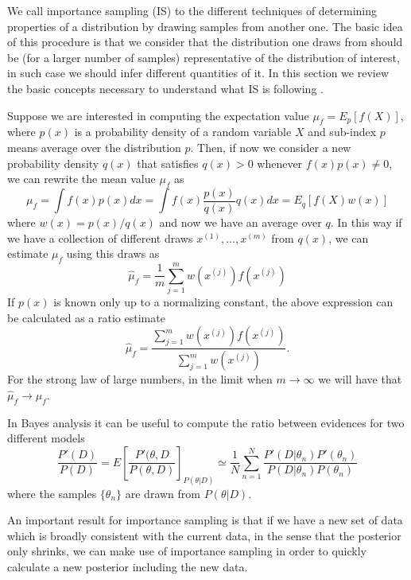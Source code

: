 \documentclass[onecolumn,           %
               showpacs,            %
               preprintnumbers,     %
               aps,                 %
               prl,          	    %
               letterpaper,             %
               superscriptaddress,      %
               nofootinbib,         %
               tightenlines,        %
               floats,floatfix      %
               ,usenatbib,
               ]{revtex4-1}
\begin{document}
We call importance sampling (IS) to the different techniques of determining properties of a distribution by drawing samples from another one. The basic idea of this procedure is that we consider that the distribution one draws from should be (for a larger number of samples) 
 representative of the distribution of interest, in such case we should infer different quantities of it. In this section we review the basic concepts necessary to understand what IS is following \cite{importancesampling}.

Suppose we are interested in computing the expectation value $\mu_f=E_p[f(X)]$, where $p(x)$ is a probability density of a random variable $X$ and sub-index $p$ means average over the distribution $p$. Then, if now we consider a new probability density $q(x)$ that satisfies $q(x)>0$ whenever $f(x)p(x)\not = 0$, we can rewrite the mean value $\mu_f$ as
\begin{equation}
\mu_f = \int f(x)p(x)dx=\int f(x)\frac{p(x)}{q(x)}q(x)dx=E_q[f(X)w(x)]
\end{equation}
where $w(x)=p(x)/q(x)$ and now we have an average over $q$. In this way if we have a collection of different draws $x^{(1)},...,x^{(m)}$ from $q(x)$, we can estimate $\mu_f$ using this draws as
\begin{equation}
\hat \mu_f = \frac{1}{m}\sum_{j=1}^m w(x^{(j)})f(x^{(j)})
\end{equation}
If $p(x)$ is known only up to a normalizing constant, the above expression can be calculated  as a ratio estimate
\begin{equation}
\hat \mu_f=\frac{\sum_{j=1}^m w(x^{(j)})f(x^{(j)})}{\sum_{j=1}^mw(x^{(j)})}.
\end{equation}
For the strong law of large numbers, in the limit when $m\rightarrow \infty$ we will have that $\hat \mu_f\rightarrow \mu_f$.

In Bayes analysis it can be useful to compute the ratio between evidences for two different models
\begin{equation}\label{importanceratio}
\frac{P'(D)}{P(D)}=E\left[\frac{P'(\theta,D}{P(\theta,D)}\right]_{P(\theta|D)}\simeq \frac{1}{N}\sum_{n=1}^N\frac{P'(D|\theta_n)P'(\theta_n)}{P(D|\theta_n)P(\theta_n)}
\end{equation}
where the samples $\lbrace\theta_n\rbrace$ are drawn from $P(\theta|D)$.

An important result for importance sampling is that if we have a new set of data which is broadly consistent with the current data, in the sense that the posterior only shrinks, we can make use of importance sampling in order to quickly calculate a new posterior including the new data.
\end{document}
